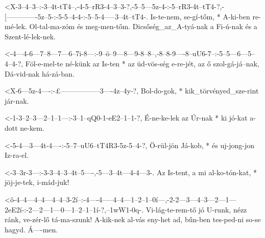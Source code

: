   {<X-3--4--3--:-3--4t-tT4--,-4-5--rR3-4--3--3-?,-5--5---5z-4-:-5--rR3-4t--tT4-?,-[-------------5z--5-:-5-5--4-4-:-5--5-4-----3--4t--tT4-.}
  {   Is-te-nem, se-gí-tőm, * A-ki-ben re-mé-lek. Ol-tal-ma-zóm és meg-men-tőm.   Dicsőség_az_A-tyá-nak a Fi-ú-nak és a Szent-lé-lek-nek.}

  {<-4---4-6---7--8---7---6--7i-8---:-9--ö--9---8---9-8--8--,-8--8-9----8--uU6-7--:-5--5---6---5--4--4-?,}
  {  Föl-e-mel-te né-künk az Is-ten * az üd-vös-ség e-re-jét, az ő szol-gá-já--nak, Dá-vid-nak há-zá-ban.}


  {<X-6---5z-4----:-£-----------------3----4z--4y-?,}
  {   Bol-do-gok, * kik_törvényed_sze-rint jár-nak.}

  {<-1-3--2--3---2--1--1---:-3--1--qQ0-1-eE2--1--1-?,}
  {  É-ne-ke-lek az Úr-nak * ki jó-kat a-dott ne-kem.}

  {<-5-4---3---4t-4----:-5--7--uU6--tT4R3-5z-5--4-?,}
  {  Ö-rül-jön Já-kob, * és uj-jong-jon   Iz-ra-el.}



  {<-3--3r-3---:-3-3--4--3--4t--5----,-5---3--4t---4-4---3-.}
  {  Az Is-tent, a mi al-ko-tón-kat, * jöj-je-tek, i-mád-juk!}


  {<ô-4--4---4--4---4--4--3-2í--:-4----4-----4--4---1--2--1--0í---,-2-2---3---4--3---2---1---2eE2í-:-2---2---1---0---1--2--1--1í-?,--1wW1-0q-.}
  {   Vi-lág-te-rem-tő jó U-runk, nézz ránk, ve-zér-lő tá-ma-szunk! A-kik-nek al-vás eny-het ad,     bűn-ben tes-ped-ni so-se hagyd. Á----men.}

